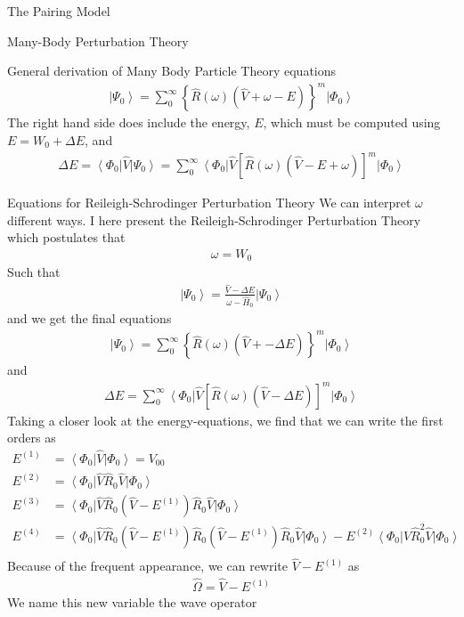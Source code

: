 \documentclass[twoside,english]{uiofysmaster}
\begin{document}
\begin{chapter}{The Pairing Model}
\begin{section}{Many-Body Perturbation Theory}
\begin{subsection}{General derivation of Many Body Particle Theory equations}
 		\begin{align}
 			\left| \Psi_0 \right> = \sum_0^\infty \left\{ \hat R(\omega) (\hat V + \omega - E) \right\}^m \left| \Phi_0 \right>
 		\end{align}
 		The right hand side does include the energy, $E$, which must be computed using $ E = W_0 + \Delta E$, and
 		\begin{align}
 			\Delta E = \left< \Phi_0 \right| \hat V \left| \Psi_0 \right> 
 			= \sum_0^\infty \left< \Phi_0 \right| \hat V \left[ \hat R(\omega) (\hat V - E + \omega) \right]^m \left| \Phi_0 \right>  
 		\end{align}
 	\end{subsection}

 	\begin{subsection}{Equations for Reileigh-Schrodinger Perturbation Theory}
 		We can interpret $\omega$ different ways. I here present the Reileigh-Schrodinger Perturbation Theory which postulates that
 		\begin{align}
 			\omega = W_0 
 		\end{align}
 		Such that 
 		\begin{align}
 			\left| \Psi_0 \right> = \frac{ \hat V - \Delta E }{\omega - \hat H_0} \left| \Psi_0 \right>
 		\end{align}
 		and we get the final equations
 		\begin{align}
 			\left| \Psi_0 \right> = \sum_0^\infty \left\{ \hat R(\omega) (\hat V + - \Delta E) \right\}^m \left| \Phi_0 \right>
 		\end{align}
 		and
 		\begin{align}
 			\Delta E = \sum_0^\infty \left< \Phi_0 \right| \hat V \left[ \hat R(\omega) (\hat V - \Delta E) \right]^m \left| \Phi_0 \right>  
 		\end{align}
 		Taking a closer look at the energy-equations, we find that we can write the first orders as
 		\begin{align*}
 			E^{(1)} &= \left< \Phi_0 \right| \hat V \left| \Phi_0 \right>  = V_{00}\\
 			E^{(2)} &= \left< \Phi_0 \right| \hat V \hat R_0 \hat V \left| \Phi_0 \right> \\
 			E^{(3)} &= \left< \Phi_0 \right| \hat V \hat R_0 (\hat V - E^{(1)})  \hat R_0 \hat V \left| \Phi_0 \right> \\
 			E^{(4)} &= \left< \Phi_0 \right| \hat V \hat R_0 (\hat V - E^{(1)})  \hat R_0 (\hat V - E^{(1)}) \hat R_0 \hat V \left| \Phi_0 \right> 
 					- E^{(2)} \left< \Phi_0 \right| \hat V \hat R_0^2 \hat V \left| \Phi_0 \right>\\
  		\end{align*}
  		Because of the frequent appearance, we can rewrite $\hat V - E^{(1)}$ as
  		\begin{align}
  			\hat \Omega = \hat V - E^{(1)}
  		\end{align}
  		We name this new variable the wave operator
 	\end{subsection}


\end{section}
\end{chapter}
\end{document}
